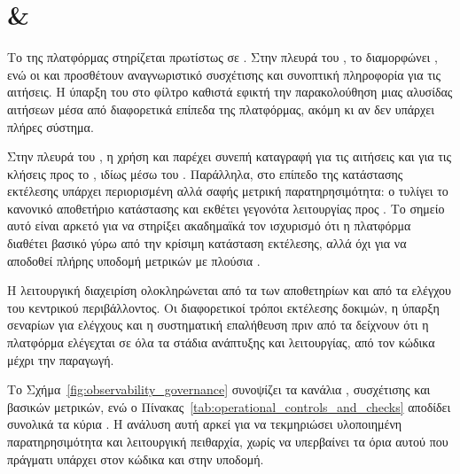 \section{ \& }
\label{sec:observability_governance}

Το  της πλατφόρμας στηρίζεται πρωτίστως σε . Στην πλευρά του , το \texttt{} διαμορφώνει , ενώ οι \texttt{} και \texttt{} προσθέτουν αναγνωριστικό συσχέτισης και συνοπτική πληροφορία για τις  αιτήσεις. Η ύπαρξη του  στο φίλτρο καθιστά εφικτή την παρακολούθηση μιας αλυσίδας αιτήσεων μέσα από διαφορετικά επίπεδα της πλατφόρμας, ακόμη κι αν δεν υπάρχει πλήρες  σύστημα.

Στην πλευρά του , η χρήση  και  παρέχει συνεπή καταγραφή για τις αιτήσεις και για τις κλήσεις προς το , ιδίως μέσω του \texttt{}. Παράλληλα, στο επίπεδο της κατάστασης εκτέλεσης υπάρχει περιορισμένη αλλά σαφής μετρική παρατηρησιμότητα: ο \texttt{} τυλίγει το κανονικό αποθετήριο κατάστασης και εκθέτει γεγονότα λειτουργίας προς . Το σημείο αυτό είναι αρκετό για να στηρίξει ακαδημαϊκά τον ισχυρισμό ότι η πλατφόρμα διαθέτει βασικό  γύρω από την κρίσιμη κατάσταση εκτέλεσης, αλλά όχι για να αποδοθεί πλήρης υποδομή μετρικών με πλούσια .

Η λειτουργική διαχειρίση ολοκληρώνεται από τα  των αποθετηρίων και από τα  ελέγχου του κεντρικού περιβάλλοντος. Οι διαφορετικοί τρόποι εκτέλεσης δοκιμών, η ύπαρξη  σεναρίων για ελέγχους  και η συστηματική επαλήθευση  πριν από τα  δείχνουν ότι η πλατφόρμα ελέγεχται σε όλα τα στάδια ανάπτυξης και λειτουργίας, από τον κώδικα μέχρι την παραγωγή.

Το Σχήμα~\ref{fig:observability_governance} συνοψίζει τα κανάλια , συσχέτισης και βασικών μετρικών, ενώ ο Πίνακας~\ref{tab:operational_controls_and_checks} αποδίδει συνολικά τα κύρια . Η ανάλυση αυτή αρκεί για να τεκμηριώσει υλοποιημένη παρατηρησιμότητα και λειτουργική πειθαρχία, χωρίς να υπερβαίνει τα όρια αυτού που πράγματι υπάρχει στον κώδικα και στην υποδομή.



\begin{table}[H]
\centering
\caption{Υλοποιημένοι λειτουργικοί έλεγχοι, σήματα παρατηρησιμότητας και σημεία επιχειρησιακής επαλήθευσης}
\label{tab:operational_controls_and_checks}

\end{table}
